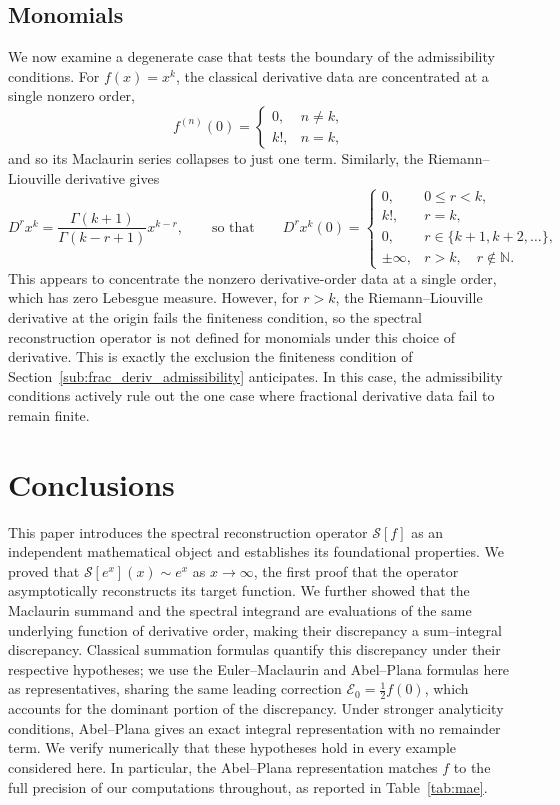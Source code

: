 \documentclass[preprint, 12pt]{elsarticle}
\theoremstyle{definition}
\theoremstyle{plain}
\theoremstyle{remark}
\begin{document}
\subsection{Monomials}
\label{sec:monomials}
We now examine a degenerate case that tests the boundary of the admissibility conditions. For $f(x)=x^k$, the classical derivative data are concentrated at a single nonzero order,
\[
f^{(n)}(0)
=
\begin{cases}
0, & n \neq k,\\
k!, & n = k,
\end{cases}
\]
and so its Maclaurin series collapses to just one term. Similarly, the Riemann--Liouville derivative gives
\[
D^r x^k
=
\frac{\Gamma(k+1)}
{\Gamma(k-r+1)}
x^{k-r},
\qquad\text{so that}\qquad
D^r x^k(0)
=
\begin{cases}
0, & 0\le r<k,\\
k!, & r=k,\\
0, & r\in\{k+1,k+2,\ldots\},\\
\pm\infty, & r>k,\quad r\notin\mathbb N.
\end{cases}
\]
This appears to concentrate the nonzero derivative-order data at a single order, which has zero Lebesgue measure. However, for $r>k$, the Riemann--Liouville derivative at the origin fails the finiteness condition, so the spectral reconstruction operator is not defined for monomials under this choice of derivative. This is exactly the exclusion the finiteness condition of Section~\ref{sub:frac_deriv_admissibility} anticipates. In this case, the admissibility conditions actively rule out the one case where fractional derivative data fail to remain finite.

\section{Conclusions}

This paper introduces the spectral reconstruction operator $\mathcal{S}[f]$ as an independent mathematical object and establishes its foundational properties. We proved that $\mathcal{S}[e^x](x) \sim e^x$ as $x \to \infty$, the first proof that the operator asymptotically reconstructs its target function. We further showed that the Maclaurin summand and the spectral integrand are evaluations of the same underlying function of derivative order, making their discrepancy a sum--integral discrepancy. Classical summation formulas quantify this discrepancy under their respective hypotheses; we use the Euler--Maclaurin and Abel--Plana formulas here as representatives, sharing the same leading correction $\mathcal{E}_0=\frac{1}{2}f(0)$, which accounts for the dominant portion of the discrepancy. Under stronger analyticity conditions, Abel--Plana gives an exact integral representation with no remainder term. We verify numerically that these hypotheses hold in every example considered here. In particular, the Abel--Plana representation matches $f$ to the full precision of our computations throughout, as reported in Table~\ref{tab:mae}.
\end{document}
